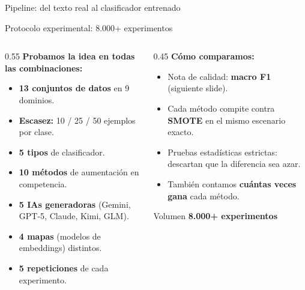 \begin{frame}{Pipeline: del texto real al clasificador entrenado}
\vspace{0.5em}
\end{frame}

\begin{frame}{Protocolo experimental: 8.000+ experimentos}
\small
\begin{columns}[T]

\begin{column}{0.55\textwidth}
\textbf{Probamos la idea en todas las combinaciones:}
\begin{itemize}\setlength\itemsep{0pt}
  \item \textbf{13 conjuntos de datos} en 9 dominios.
  \item \textbf{Escasez:} 10 / 25 / 50 ejemplos por clase.
  \item \textbf{5 tipos} de clasificador.
  \item \textbf{10 métodos} de aumentación en competencia.
  \item \textbf{5 IAs generadoras} (Gemini, GPT-5, Claude, Kimi, GLM).
  \item \textbf{4 mapas} (modelos de embeddings) distintos.
  \item \textbf{5 repeticiones} de cada experimento.
\end{itemize}
\end{column}

\begin{column}{0.45\textwidth}
\textbf{Cómo comparamos:}
\begin{itemize}\setlength\itemsep{0pt}
  \item Nota de calidad: \textbf{macro F1} (siguiente slide).
  \item Cada método compite contra \textbf{SMOTE} en el mismo escenario exacto.
  \item Pruebas estadísticas estrictas: descartan que la diferencia sea \alert{azar}.
  \item También contamos \textbf{cuántas veces gana} cada método.
\end{itemize}

\vspace{0.3em}
\begin{block}{Volumen}
\centering\bfseries\large 8.000+ experimentos
\end{block}
\end{column}

\end{columns}
\end{frame}

